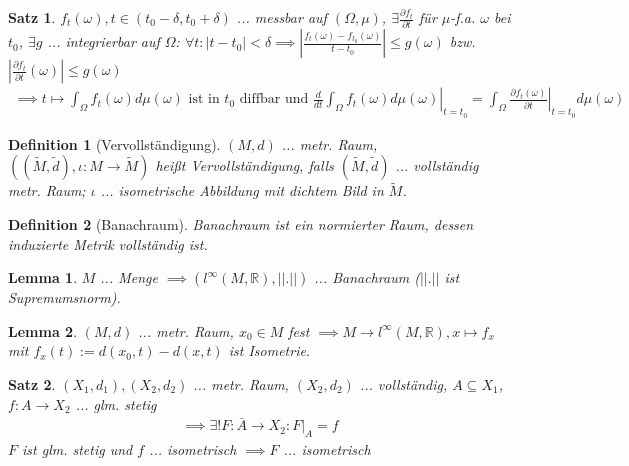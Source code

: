 \documentclass[]{article}
\newtheorem*{theorem}{Satz}
\newtheorem*{lemma}{Lemma}
\newtheorem*{definition}{Definition}
\begin{document}
\begin{theorem}
		$f_t(\omega), t\in(t_0-\delta,t_0+\delta)$ ... messbar auf $(\Omega, \mu)$, $\exists \frac{\partial f_t}{\partial t}$ für $\mu$-f.a. $\omega$ bei $t_0$, $\exists g$ ... integrierbar auf $\Omega$: $\forall t: |t-t_0| < \delta \implies \left|\frac{f_t(\omega)-f_{t_0}(\omega)}{t-t_0}\right| \leq g(\omega)$ bzw. $\left|\frac{\partial f_t}{\partial t}(\omega)\right| \leq g(\omega)$
	\begin{align*}
		\implies t\mapsto \int_{\Omega} f_t(\omega) d\mu(\omega) \text{ ist in }t_0\text{ diffbar und }\left.\frac{d}{dt} \int_{\Omega} f_t(\omega) d\mu(\omega)\right|_{t=t_0} = \int_{\Omega}\left.\frac{\partial f_t(\omega)}{\partial t}\right|_{t=t_0} d\mu(\omega)
	\end{align*}
\end{theorem}

\begin{definition}[Vervollständigung]
	$(M,d)$ ... metr. Raum, $((\tilde{M}, \tilde{d}), \iota:M\rightarrow\tilde{M})$ heißt Vervollständigung, falls $(\tilde{M}, \tilde{d})$ ... vollständig metr. Raum; $\iota$ ... isometrische Abbildung mit dichtem Bild in $\tilde{M}$.
\end{definition}

\begin{definition}[Banachraum]
	Banachraum ist ein normierter Raum, dessen induzierte Metrik vollständig ist.
\end{definition}

\begin{lemma}
	$M$ ... Menge $\implies (l^\infty(M, \mathbb{R}), ||.||)$ ... Banachraum ($||.||$ ist Supremumsnorm).
\end{lemma}

\begin{lemma}
	$(M, d)$ ... metr. Raum, $x_0 \in M$ fest $\implies M\rightarrow l^\infty(M, \mathbb{R}), x\mapsto f_x$ mit $f_x(t):=d(x_0, t) - d(x, t)$ ist Isometrie.
\end{lemma}

\begin{theorem}
	$(X_1, d_1), (X_2, d_2)$ ... metr. Raum, $(X_2, d_2)$ ... vollständig, $A\subseteq X_1$, $f:A\rightarrow X_2$ ... glm. stetig
	\begin{align*}
		\implies \exists! F:\bar{A}\rightarrow X_2 : F|_A = f
	\end{align*}
	$F$ ist glm. stetig und $f$ ... isometrisch $\implies F$ ... isometrisch
\end{theorem}
\end{document}
